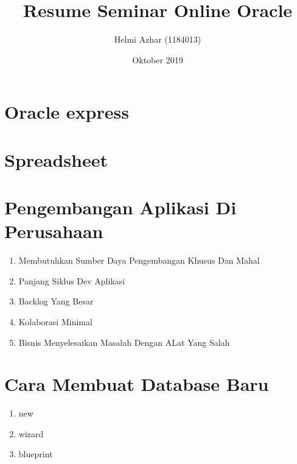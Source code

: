 ﻿\documentclass{article}
\title{Resume Seminar Online Oracle}
\author{Helmi Azhar (1184013) }
\date{Oktober 2019}
\begin{document}
\maketitle

\section{Oracle express}
\begin{enumerate}
\usepackage{Oracle Apex merupakan suatu aplikasi atau tools  untuk memudahkan apa yang kita butuhkan. Sesuai namanya, oracle express bila dipelajari lebih dalam banyak memberi kemudahan dalam melayanani kebutuhan user contohnya dalam pembuatan aplikasi sederhana,belajar function dan lain-lain. Oracle apex juga dapat mengembangkan aplikasi web desktop dan seluler, memvisualisasikan dan memelihara data basis data, dan meningkatkan keterampilan sql dan kemampuan basis data}
\end{enumerate}
\section{Spreadsheet}
\begin{enumerate}
    \usepackage{ Spreadsheetadalah fitur untuk memungkinkan pengguna untuk menyimpan berbagai informasi yang sangat lengkap,pada setiap kolomnya bisa menyimpan berbagai data informasi yang berbeda dari informasi yang diperlukan.}
\end{enumerate}

\section{Pengembangan Aplikasi Di Perusahaan}
\begin{enumerate}
    \item Membutuhkan Sumber Daya Pengembangan Khusus Dan Mahal
    \item Panjang Siklus Dev Aplikasi
    \item Backlog Yang Besar
    \item Kolaborasi Minimal
    \item Bisnis Menyelesaikan Masalah Dengan ALat Yang Salah 
    \end{enumerate}
  

\section{Cara Membuat Database Baru}
\begin{enumerate}
    \item new
    \item wizard
    \item blueprint
\end{enumerate}
\end{document}
